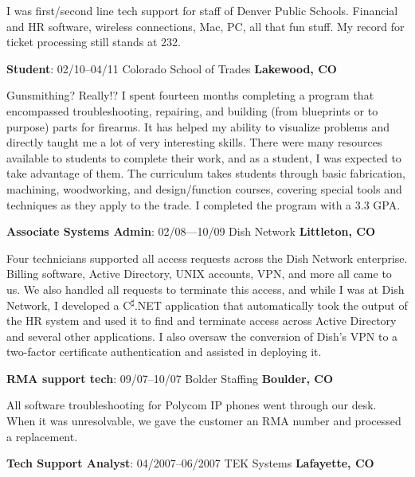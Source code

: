 \documentclass[a4paper,12pt]{article}
\begin{document}
I was first/second line tech support for staff of Denver Public Schools.
Financial and HR software, wireless connections, Mac, PC, all that fun stuff.
My record for ticket processing still stands at 232.

\begin{flushleft}
\textbf{Student}: 02/10--04/11 Colorado School of Trades \textbf{Lakewood, CO}
\end{flushleft}

Gunsmithing? Really!? I spent fourteen months completing a program that
encompassed troubleshooting, repairing, and building (from blueprints or to
purpose) parts for firearms. It has helped my ability to visualize problems
and directly taught me a lot of very interesting skills. There were many
resources available to students to complete their work, and as a student, I
was expected to take advantage of them. The curriculum takes students through
basic fabrication, machining, woodworking, and design/function courses,
covering special tools and techniques as they apply to the trade. I completed
the program with a 3.3 GPA.

\begin{flushleft}
\textbf{Associate Systems Admin}: 02/08---10/09 Dish Network
\textbf{Littleton, CO}
\end{flushleft}

Four technicians supported all access requests across the Dish Network
enterprise. Billing software, Active Directory, UNIX accounts, VPN, and more
all came to us. We also handled all requests to terminate this access, and
while I was at Dish Network, I developed a C\textsuperscript{{$\sharp$}}.NET
application that automatically took the output of the HR system and used it to
find and terminate access across Active Directory and several other
applications. I also oversaw the conversion of Dish's VPN to a two-factor
certificate authentication and assisted in deploying it.

\begin{flushleft}
\textbf{RMA support tech}: 09/07--10/07 Bolder Staffing \textbf{Boulder, CO}
\end{flushleft}

All software troubleshooting for Polycom IP phones went through our desk. When
it was unresolvable, we gave the customer an RMA number and processed a
replacement.

\begin{flushleft}
\textbf{Tech Support Analyst}: 04/2007--06/2007 TEK Systems 
\textbf{Lafayette, CO}
\end{flushleft}
\end{document}
